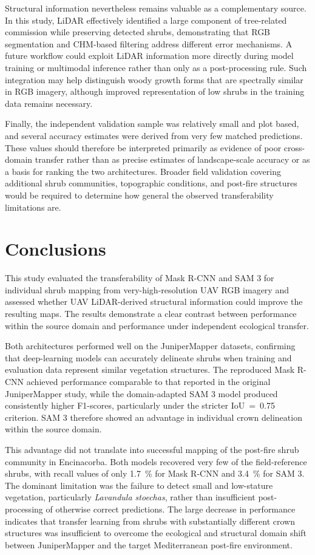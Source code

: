 \documentclass[12pt,a4paper]{article}
\begin{document}
Structural information nevertheless remains valuable as a complementary source. In this study, LiDAR effectively identified a large component of tree-related commission while preserving detected shrubs, demonstrating that RGB segmentation and CHM-based filtering address different error mechanisms. A future workflow could exploit LiDAR information more directly during model training or multimodal inference rather than only as a post-processing rule. Such integration may help distinguish woody growth forms that are spectrally similar in RGB imagery, although improved representation of low shrubs in the training data remains necessary.

Finally, the independent validation sample was relatively small and plot based, and several accuracy estimates were derived from very few matched predictions. These values should therefore be interpreted primarily as evidence of poor cross-domain transfer rather than as precise estimates of landscape-scale accuracy or as a basis for ranking the two architectures. Broader field validation covering additional shrub communities, topographic conditions, and post-fire structures would be required to determine how general the observed transferability limitations are.

\section{Conclusions}

This study evaluated the transferability of Mask R-CNN and SAM 3 for individual shrub mapping from very-high-resolution UAV RGB imagery and assessed whether UAV LiDAR-derived structural information could improve the resulting maps. The results demonstrate a clear contrast between performance within the source domain and performance under independent ecological transfer.

Both architectures performed well on the JuniperMapper datasets, confirming that deep-learning models can accurately delineate shrubs when training and evaluation data represent similar vegetation structures. The reproduced Mask R-CNN achieved performance comparable to that reported in the original JuniperMapper study, while the domain-adapted SAM 3 model produced consistently higher F1-scores, particularly under the stricter IoU~=~0.75 criterion. SAM 3 therefore showed an advantage in individual crown delineation within the source domain.

This advantage did not translate into successful mapping of the post-fire shrub community in Encinacorba. Both models recovered very few of the field-reference shrubs, with recall values of only \qty{1.7}{\percent} for Mask R-CNN and \qty{3.4}{\percent} for SAM 3. The dominant limitation was the failure to detect small and low-stature vegetation, particularly \textit{Lavandula stoechas}, rather than insufficient post-processing of otherwise correct predictions. The large decrease in performance indicates that transfer learning from shrubs with substantially different crown structures was insufficient to overcome the ecological and structural domain shift between JuniperMapper and the target Mediterranean post-fire environment.
\end{document}

